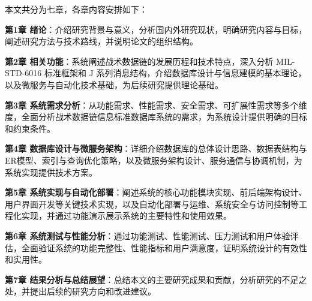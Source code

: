 本文共分为七章，各章内容安排如下：

\textbf{第1章 绪论}：介绍研究背景与意义，分析国内外研究现状，明确研究内容与目标，阐述研究方法与技术路线，并说明论文的组织结构。

\textbf{第2章 相关功能}：系统阐述战术数据链的发展历程和技术特点，深入分析 MIL-STD-6016 标准框架和 J 系列消息结构，介绍数据库设计与信息建模的基本理论，以及微服务与自动化技术基础，为后续研究提供理论基础。

\textbf{第3章 系统需求分析}：从功能需求、性能需求、安全需求、可扩展性需求等多个维度，全面分析战术数据链信息标准数据库系统的需求，为系统设计提供明确的目标和约束条件。

\textbf{第4章 数据库设计与微服务架构}：详细介绍数据库的总体设计思路、数据表结构与ER模型、索引与查询优化策略，以及微服务架构设计、服务通信与协调机制，为系统实现提供技术方案。

\textbf{第5章 系统实现与自动化部署}：阐述系统的核心功能模块实现、前后端架构设计、用户界面开发等关键技术实现，以及自动化部署与运维、系统安全与访问控制等工程化实现，并通过功能演示展示系统的主要特性和使用效果。

\textbf{第6章 系统测试与性能分析}：通过功能测试、性能测试、压力测试和用户体验评估，全面验证系统的功能完整性、性能指标和用户满意度，证明系统设计的有效性和实用性。

\textbf{第7章 结果分析与总结展望}：总结本文的主要研究成果和贡献，分析研究的不足之处，并提出后续的研究方向和改进建议。

